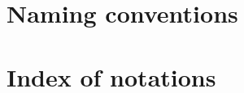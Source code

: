 \documentclass{book}
\begin{document}
\chapter{Naming conventions}

\chapter{Index of notations}



\end{document}
